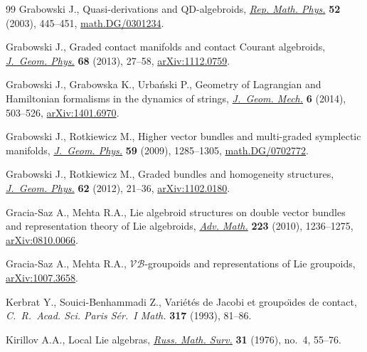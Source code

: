 \begin{thebibliography}{99}
Grabowski J., Quasi-derivations and {QD}-algebroids, \href{http://dx.doi.org/10.1016/S0034-4877(03)80041-1}{\textit{Rep. Math. Phys.}}
  \textbf{52} (2003), 445--451, \href{http://arxiv.org/abs/math.DG/0301234}{math.DG/0301234}.

Grabowski J., Graded contact manifolds and contact {C}ourant algebroids,
  \href{http://dx.doi.org/10.1016/j.geomphys.2013.02.001}{\textit{J.~Geom. Phys.}} \textbf{68} (2013), 27--58, \href{http://arxiv.org/abs/1112.0759}{arXiv:1112.0759}.

Grabowski J., Grabowska K., Urba{\'n}ski P., Geometry of {L}agrangian and
  {H}amiltonian formalisms in the dynamics of strings, \href{http://dx.doi.org/10.3934/jgm.2014.6.503}{\textit{J.~Geom. Mech.}}
  \textbf{6} (2014), 503--526, \href{http://arxiv.org/abs/1401.6970}{arXiv:1401.6970}.

Grabowski J., Rotkiewicz M., Higher vector bundles and multi-graded symplectic
  manifolds, \href{http://dx.doi.org/10.1016/j.geomphys.2009.06.009}{\textit{J.~Geom. Phys.}} \textbf{59} (2009), 1285--1305,
  \href{http://arxiv.org/abs/math.DG/0702772}{math.DG/0702772}.

Grabowski J., Rotkiewicz M., Graded bundles and homogeneity structures,
  \href{http://dx.doi.org/10.1016/j.geomphys.2011.09.004}{\textit{J.~Geom. Phys.}} \textbf{62} (2012), 21--36, \href{http://arxiv.org/abs/1102.0180}{arXiv:1102.0180}.

Gracia-Saz A., Mehta R.A., Lie algebroid structures on double vector bundles
  and representation theory of {L}ie algebroids, \href{http://dx.doi.org/10.1016/j.aim.2009.09.010}{\textit{Adv. Math.}}
  \textbf{223} (2010), 1236--1275, \href{http://arxiv.org/abs/0810.0066}{arXiv:0810.0066}.

Gracia-Saz A., Mehta R.A., $\mathcal{VB}$-groupoids and representations of Lie
  groupoids, \href{http://arxiv.org/abs/1007.3658}{arXiv:1007.3658}.



Kerbrat Y., Souici-Benhammadi Z., Vari\'et\'es de {J}acobi et groupo\"\i des de
  contact, \textit{C.~R.~Acad. Sci. Paris S\'er.~I Math.} \textbf{317} (1993),
  81--86.

Kirillov A.A., Local {L}ie algebras, \href{http://dx.doi.org/10.1070/RM1976v031n04ABEH001556}{\textit{Russ. Math. Surv.}} \textbf{31}
  (1976), no.~4, 55--76.


\end{thebibliography}
